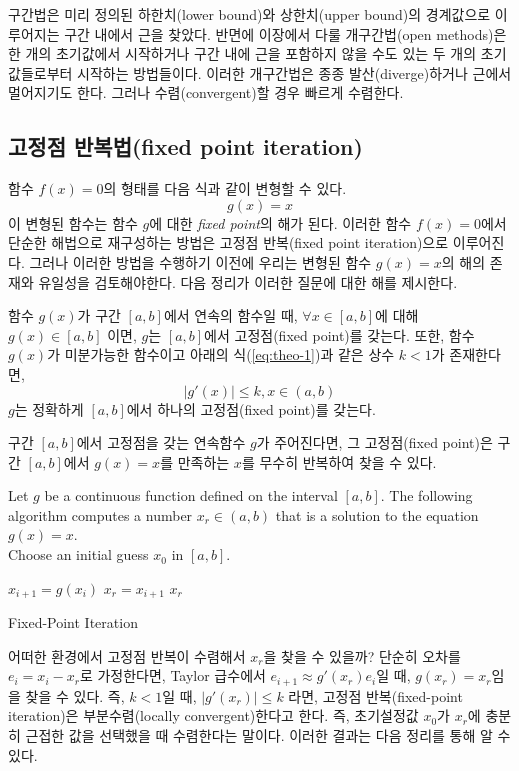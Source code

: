 구간법은 미리 정의된 하한치(lower bound)와 상한치(upper bound)의 경계값으로 이루어지는 구간 내에서 근을 찾았다. 반면에 이장에서 다룰 개구간법(open methods)은 한 개의 초기값에서 시작하거나 구간 내에 근을 포함하지 않을 수도 있는 두 개의 초기값들로부터 시작하는 방법들이다. 이러한 개구간법은 종종 발산(diverge)하거나 근에서 멀어지기도 한다. 그러나 수렴(convergent)할 경우 빠르게 수렴한다.

\subsection{고정점 반복법(fixed point iteration)}
함수 $f(x)=0$의 형태를 다음 식과 같이 변형할 수 있다.
\begin{equation}\label{eq:6-1}
g(x)=x
\end{equation}
이 변형된 함수는 함수 $g$에 대한 \textsl{fixed point}의 해가 된다. 이러한 함수 $f(x)=0$에서 단순한 해법으로 재구성하는 방법은 고정점 반복(fixed point iteration)으로 이루어진다. 그러나 이러한 방법을 수행하기 이전에 우리는 변형된 함수 $g(x)=x$의 해의 존재와 유일성을 검토해야한다. 다음 정리가 이러한 질문에 대한 해를 제시한다.
\begin{theorem}\label{theo:6-1}
함수 $g(x)$가 구간 $[a,b]$에서 연속의 함수일 때, $\forall x \in [a,b]$에 대해 $g(x)\in [a,b]$ 이면, $g$는 $[a,b]$에서 고정점(fixed point)를 갖는다. 또한, 함수 $g(x)$가 미분가능한 함수이고 아래의 식(\ref{eq:theo-1})과 같은 상수 $k<1$가 존재한다면,
\begin{equation}\label{eq:theo-1}
\left|g'(x)\right|\leq k, x \in (a,b)
\end{equation}
$g$는 정확하게 $[a,b]$에서 하나의 고정점(fixed point)를 갖는다.
\end{theorem}
구간 $[a,b]$에서 고정점을 갖는 연속함수 $g$가 주어진다면, 그 고정점(fixed point)은 구간 $[a,b]$에서 $g(x)=x$를 만족하는 $x$를 무수히 반복하여 찾을 수 있다.

\begin{algorithm}
Let $g$ be a continuous function defined on the interval $[a,b]$. The following algorithm computes a number $x_{r} \in (a,b)$ that is a solution to the equation $g(x)=x$.\\
Choose an initial guess $x_{0}$ in $[a,b]$.

\begin{algorithmic}
\State $x_{i+1}=g(x_{i})$
\State $x_{r}=x_{i+1}$
\State \Return $x_{r}$
\EndIf
\EndFor
\end{algorithmic}
\caption{Fixed-Point Iteration}
\end{algorithm}
어떠한 환경에서 고정점 반복이 수렴해서 $x_{r}$을 찾을 수 있을까? 단순히 오차를 $e_{i}=x_{i}-x_{r}$로 가정한다면, Taylor 급수에서 $e_{i+1}\approx g'(x_{r})e_{i}$일 때, $g(x_{r})=x_{r}$임을 찾을 수 있다. 즉, $k<1$일 때, $\left|g'(x_{r})\right| \leq k$ 라면, 고정점 반복(fixed-point iteration)은 부분수렴(locally convergent)한다고 한다. 즉, 초기설정값 $x_{0}$가  $x_{r}$에 충분히 근접한 값을 선택했을 때 수렴한다는 말이다. 이러한 결과는 다음 정리를 통해 알 수 있다.

